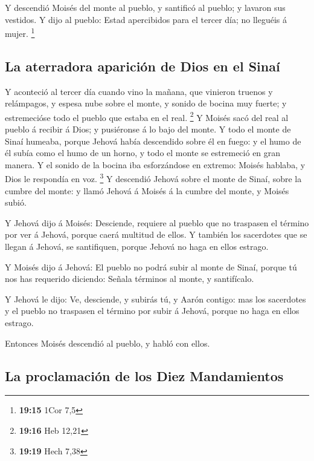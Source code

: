  Y descendió Moisés del monte al pueblo, y santificó al
pueblo; y lavaron sus vestidos.  Y dijo al pueblo: Estad
apercibidos para el tercer día; no lleguéis á mujer. \footnote{\textbf{19:15}
  1Cor 7,5}

\hypertarget{la-aterradora-apariciuxf3n-de-dios-en-el-sinauxed}{%
\subsection{La aterradora aparición de Dios en el
Sinaí}\label{la-aterradora-apariciuxf3n-de-dios-en-el-sinauxed}}

 Y aconteció al tercer día cuando vino la mañana, que
vinieron truenos y relámpagos, y espesa nube sobre el monte, y sonido de
bocina muy fuerte; y estremecióse todo el pueblo que estaba en el real.
\footnote{\textbf{19:16} Heb 12,21}  Y Moisés sacó del real
al pueblo á recibir á Dios; y pusiéronse á lo bajo del monte.
 Y todo el monte de Sinaí humeaba, porque Jehová había
descendido sobre él en fuego: y el humo de él subía como el humo de un
horno, y todo el monte se estremeció en gran manera.  Y el
sonido de la bocina iba esforzándose en extremo: Moisés hablaba, y Dios
le respondía en voz. \footnote{\textbf{19:19} Hech 7,38}  Y
descendió Jehová sobre el monte de Sinaí, sobre la cumbre del monte: y
llamó Jehová á Moisés á la cumbre del monte, y Moisés subió.

 Y Jehová dijo á Moisés: Desciende, requiere al pueblo que
no traspasen el término por ver á Jehová, porque caerá multitud de
ellos.  Y también los sacerdotes que se llegan á Jehová, se
santifiquen, porque Jehová no haga en ellos estrago.

 Y Moisés dijo á Jehová: El pueblo no podrá subir al monte
de Sinaí, porque tú nos has requerido diciendo: Señala términos al
monte, y santifícalo.

 Y Jehová le dijo: Ve, desciende, y subirás tú, y Aarón
contigo: mas los sacerdotes y el pueblo no traspasen el término por
subir á Jehová, porque no haga en ellos estrago.

 Entonces Moisés descendió al pueblo, y habló con ellos.

\hypertarget{la-proclamaciuxf3n-de-los-diez-mandamientos}{%
\subsection{La proclamación de los Diez
Mandamientos}\label{la-proclamaciuxf3n-de-los-diez-mandamientos}}

